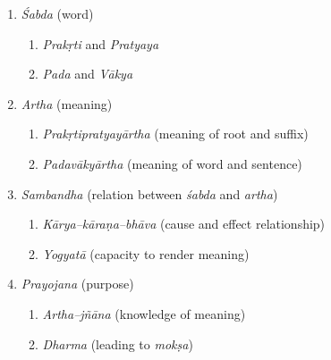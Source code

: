 \begin{enumerate}
\itemsep=0pt
\item \textit{Śabda} (word)
 
\begin{enumerate}
\itemsep=0pt
\item \textit{Prakṛti} and \textit{Pratyaya}

 \item \textit{Pada} and \textit{Vākya}
\end{enumerate}

 \item \textit{Artha} (meaning)
 
\begin{enumerate}
\itemsep=0pt
\item \textit{Prakṛtipratyayārtha} (meaning of root and suffix)

 \item \textit{Padavākyārtha} (meaning of word and sentence) 
\end{enumerate}

 \item \textit{Sambandha} (relation between \textit{śabda} and \textit{artha})
 
\begin{enumerate}
\itemsep=0pt
\item \textit{Kārya–kāraṇa–bhāva} (cause and effect relationship)

 \item \textit{Yogyatā} (capacity to render meaning)
\end{enumerate}

 \item \textit{Prayojana} (purpose)
 
\begin{enumerate}
\itemsep=0pt
\item \textit{Artha–jñāna} (knowledge of meaning)

 \item \textit{Dharma} (leading to \textit{mokṣa})
\end{enumerate}

\end{enumerate}

